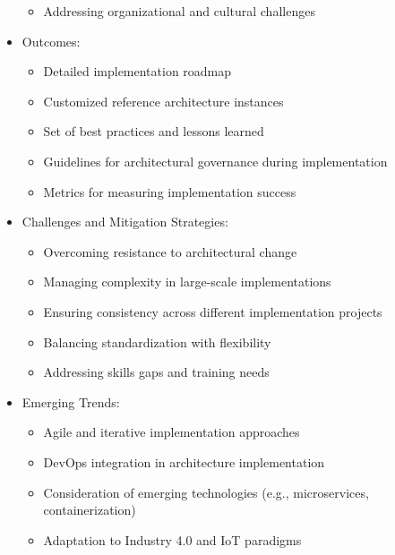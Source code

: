 \documentclass[12pt,a4paper]{article}
\begin{document}
\begin{itemize}
\begin{itemize}
        \item Addressing organizational and cultural challenges \citep{Lange2016}
    \end{itemize}
    \item Outcomes:
    \begin{itemize}
        \item Detailed implementation roadmap
        \item Customized reference architecture instances
        \item Set of best practices and lessons learned
        \item Guidelines for architectural governance during implementation
        \item Metrics for measuring implementation success
    \end{itemize}
    \item Challenges and Mitigation Strategies:
    \begin{itemize}
        \item Overcoming resistance to architectural change \citep{Zimmermann2015}
        \item Managing complexity in large-scale implementations \citep{Kruchten2006}
        \item Ensuring consistency across different implementation projects \citep{Clements2010}
        \item Balancing standardization with flexibility \citep{Angelov2012}
        \item Addressing skills gaps and training needs \citep{Martínez-Fernández2013}
    \end{itemize}
    \item Emerging Trends:
    \begin{itemize}
        \item Agile and iterative implementation approaches \citep{Madison2010}
        \item DevOps integration in architecture implementation \citep{Bass2015}
        \item Consideration of emerging technologies (e.g., microservices, containerization) \citep{Newman2015}
        \item Adaptation to Industry 4.0 and IoT paradigms \citep{Nakagawa2023}
    \end{itemize}
\end{itemize}
\end{document}
